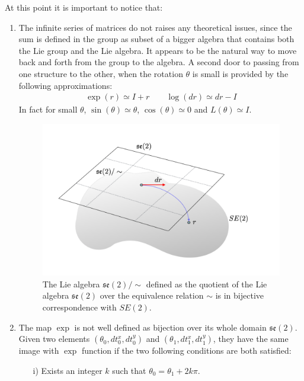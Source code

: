At this point it is important to notice that: 
\begin{enumerate}
	\item The infinite series of matrices  do not raises any theoretical issues, since the sum is defined in the group as subset of a bigger algebra that contains both the Lie group and the Lie algebra. It appears to be the natural way to move back and forth from the group to the algebra. A second door to passing from one structure to the other, when the rotation $\theta$ is small is provided by the following approximations:
	\begin{align}\label{eq:small_rotation_matrices_approx}
	\exp(r) \simeq I + r
	\qquad 
	\log(dr) \simeq dr - I
	\end{align}
	In fact for small $\theta$, $\sin(\theta) \simeq \theta$, $\cos(\theta) \simeq 0 $ and $ L(\theta) \simeq I$.
	\begin{figure}[!ht]
		\centering
		\includegraphics[scale=0.35]{figures/exp_se2.pdf}
		\caption{The Lie algebra $\mathfrak{se}(2)/\sim$ defined as the quotient of the Lie algebra $\mathfrak{se}(2)$ over the equivalence relation $\sim$ is in bijective correspondence with $SE(2)$.}
		\label{fig:exp_se2}
	\end{figure}
	\item The map $\exp$ is not well defined as bijection over its whole domain $\mathfrak{se}(2)$. Given two elements $(\theta_0, dt^{x}_0, dt^{y}_0)$ and $(\theta_1, dt^{x}_1, dt^{y}_1)$, they have the same image with $\exp$ function if the two following conditions are both satisfied:
	\begin{enumerate}
		\item[i)] Exists an integer $k$ such that $\theta_0 = \theta_1 + 2k\pi$.

\end{enumerate}
\end{enumerate}
